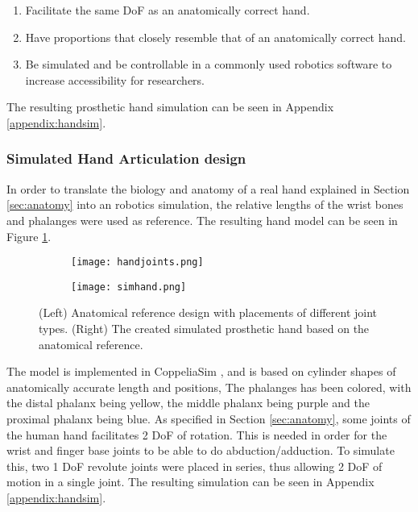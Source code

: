 \documentclass[../main.tex]{subfiles}
\begin{document}
\begin{enumerate}
\item Facilitate the same DoF as an anatomically correct hand.
\item Have proportions that closely resemble that of an anatomically correct hand.
\item Be simulated and be controllable in a commonly used robotics software to increase accessibility for researchers.
\end{enumerate}

The resulting prosthetic hand simulation can be seen in Appendix \ref{appendix:handsim}.

\subsubsection{Simulated Hand Articulation design}

In order to translate the biology and anatomy of a real hand explained in Section \ref{sec:anatomy} into an robotics simulation, the relative lengths of the wrist bones and phalanges were used as reference.
The resulting hand model can be seen in Figure \ref{fig:simdesignandimpl}.

\begin{figure}
    \centering
    \begin{subfigure}[b]{0.49\textwidth}
        \centering
        \texttt{[image: handjoints.png]}
    \end{subfigure}
    \hfill
    \centering
    \begin{subfigure}[b]{0.49\textwidth}
        \centering
        \texttt{[image: simhand.png]}
    \end{subfigure}
    \caption{(Left) Anatomical reference design with placements of different joint types. (Right) The  created simulated prosthetic hand based on the anatomical reference.}
    \label{fig:simdesignandimpl}
\end{figure}

The model is implemented in CoppeliaSim \cite{coppeliasim}, and is based on cylinder shapes of anatomically accurate length and positions,
The phalanges has been colored, with the distal phalanx being yellow, the middle phalanx being purple and the proximal phalanx being blue.
As specified in Section \ref{sec:anatomy}, some joints of the human hand facilitates 2 DoF of rotation.
This is needed in order for the wrist and finger base joints to be able to do \gls{abduction/adduction}.
To simulate this, two 1 DoF revolute joints were placed in series, thus allowing 2 DoF of motion in a single joint.
The resulting simulation can be seen in Appendix \ref{appendix:handsim}.

\end{document}
